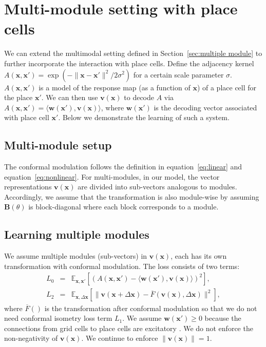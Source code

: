 \documentclass{article}
\def\eqref#1{equation~\ref{#1}}
\def\vv{{\bm{v}}}
\def\vw{{\bm{w}}}
\def\vx{{\bm{x}}}
\def\mB{{\bm{B}}}
\newcommand{\E}{\mathbb{E}}
\begin{document}
\section{Multi-module setting with place cells} \label{sec:multi_appex}
We can extend the multimodal setting defined in Section~\ref{sec:multiple module} to further incorporate the interaction with place cells. Define the adjacency kernel $A(\vx, \vx') = \exp(-\|\vx - \vx'\|^2/2\sigma^2)$ for a certain scale parameter $\sigma$. $A(\vx, \vx')$ is a model of the response map (as a function of $\vx$) of a place cell for the place $\vx'$. 
We can then use $\vv(\vx)$ to decode $A$ via $A(\vx, \vx') = \langle \vw(\vx'), \vv(\vx)\rangle$, where $\vw(\vx')$ is the decoding vector associated with place cell $\vx'$. Below we demonstrate the learning of such a system. 


\subsection{Multi-module setup}

The conformal modulation follows the definition in \eqref{eq:linear} and \eqref{eq:nonlinear}.  
For multi-modules, in our model, the vector representations $\vv(\vx)$ are divided into sub-vectors analogous to modules. Accordingly, we
assume that the transformation is also module-wise by assuming $\mB(\theta)$ is block-diagonal where each block corresponds to a module. 

\subsection{Learning multiple modules} 

We assume multiple modules (sub-vectors) in $\vv(\vx)$, each has its own transformation with conformal modulation. 
 The loss consists of two terms: 
\begin{eqnarray}
   L_0 &=& \E_{\vx, \vx'}[(A(\vx, \vx') - \langle \vw(\vx'), \vv(\vx) \rangle)^2], \\
   L_2 &=& \E_{\vx, \Delta \vx}[ \|\vv(\vx+\Delta \vx) - \overline{F}(\vv(\vx), \Delta \vx)\|^2],
\end{eqnarray}
where $\overline{F}()$ is the transformation after conformal modulation so that we do not need conformal isometry loss term $L_1$. We assume $\vw(\vx') \geq 0$ because the connections from grid cells to place cells are excitatory \citep{zhang2013optogenetic,Rowland2018}. We do not enforce the non-negativity of $\vv(\vx)$. We continue to enforce $\|\vv(\vx)\| = 1$.
\end{document}
